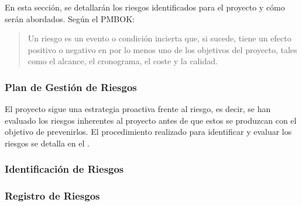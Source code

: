 En esta sección, se detallarán los riesgos identificados para el proyecto y cómo serán abordados. Según el PMBOK:
\begin{quote}
Un riesgo es un evento o condición incierta que, si sucede, tiene un efecto positivo o negativo en por lo menos uno de los objetivos del proyecto, tales como el alcance, el cronograma, el coste y la calidad. \cite{pmbok2013}
\end{quote}

\subsubsection{Plan de Gestión de Riesgos} 
El proyecto sigue una estrategia proactiva frente al riesgo, es decir, se han evaluado los riesgos inherentes al proyecto antes de que estos se produzcan con el objetivo de prevenirlos. El procedimiento realizado para identificar y evaluar los riesgos se detalla en el .


\subsubsection{Identificación de Riesgos}


\subsubsection{Registro de Riesgos}

